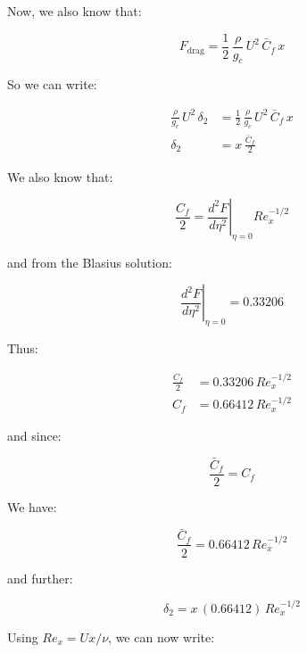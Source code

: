 \documentclass[letterpaper,12pt]{article}
\begin{document}
Now, we also know that:

\begin{equation}
    F_{\text{drag}}=\frac{1}{2}\,\frac{\rho}{g_c}\,U^2\,\bar C_f\,x
\end{equation}

So we can write:

\begin{equation}
\begin{aligned}
    \frac{\rho}{g_c}\,U^2\,\delta_2 &= \frac{1}{2}\,\frac{\rho}{g_c}\,U^2\,\bar C_f\,x \\
    \delta_2                        &= x\,\frac{\bar C_f}{2}
\end{aligned}
\end{equation}

We also know that:

\begin{equation}
    \frac{C_f}{2}=\left.\frac{d^2F}{d\eta^2}\right|_{\eta=0}Re_x^{-1/2}
\end{equation}

and from the Blasius solution:

\begin{equation}
    \left.\frac{d^2F}{d\eta^2}\right|_{\eta=0}=0.33206
\end{equation}

Thus:

\begin{equation}
\begin{aligned}
    \frac{C_f}{2} &= 0.33206\,Re_x^{-1/2} \\
    C_f         &= 0.66412\,Re_x^{-1/2}
\end{aligned}
\end{equation}

and since:

\begin{equation}
    \frac{\bar C_f}{2}=C_f
\end{equation}

We have:

\begin{equation}
    \frac{\bar C_f}{2}=0.66412\,Re_x^{-1/2}
\end{equation}

and further:

\begin{equation}
    \delta_2=x\,(0.66412)\,Re_x^{-1/2}
\end{equation}

Using $Re_x=Ux/\nu$, we can now write:
\end{document}
